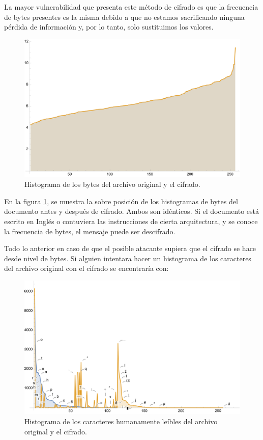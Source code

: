 \documentclass[a4paper]{article}
\begin{document}
La mayor vulnerabilidad que presenta este método de cifrado es que la
frecuencia de bytes presentes es la misma debido a que no estamos
sacrificando ninguna pérdida de información y, por lo tanto, solo sustituimos
los
valores.

\begin{figure}[H]
    \centering
    \includegraphics[width=\textwidth]{historygram.png}
    \caption{Histograma de los bytes del archivo
original y el cifrado.}
    \label{fig:Histo1}
\end{figure}

En la figura \ref{fig:Histo1}, se muestra la sobre posición de los histogramas
de bytes del documento antes y después de cifrado. Ambos son idénticos. Si el
documento está escrito en Inglés o contuviera las instrucciones de cierta
arquitectura, y se conoce la frecuencia de bytes, el mensaje puede ser
descifrado.

Todo lo anterior en caso de que el posible atacante supiera que el cifrado se
hace desde nivel de bytes. Si alguien intentara hacer un histograma de los
caracteres del archivo original con el cifrado se encontraría con:

\begin{figure}[H]
    \centering
    \includegraphics[width=\textwidth]{histo2}
    \caption{Histograma de los caracteres humanamente leíbles del archivo
original y el cifrado.}
    \label{fig:Histo2}
\end{figure}
\end{document}
